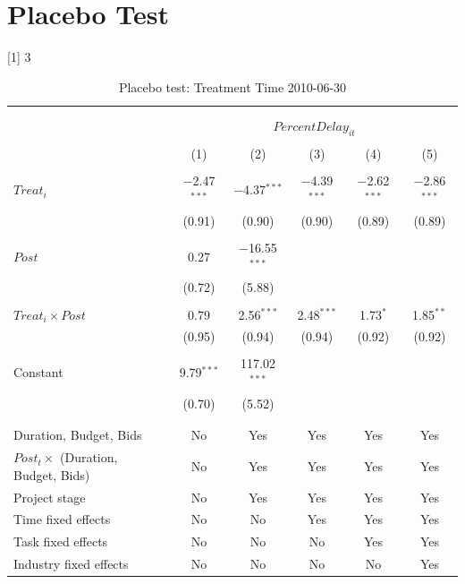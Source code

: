 \documentclass[
]{article}
\begin{document}
\hypertarget{placebo-test}{%
\section{Placebo Test}\label{placebo-test}}

{[}1{]} 3

\begin{table}[H] \centering 
  \caption{Placebo test: Treatment Time 2010-06-30} 
  \label{} 
\small 
\begin{tabular}{@{\extracolsep{-2pt}}lccccc} 
\\[-1.8ex]\hline 
\hline \\[-1.8ex] 
\\[-1.8ex] & \multicolumn{5}{c}{$PercentDelay_{it}$} \\ 
\\[-1.8ex] & (1) & (2) & (3) & (4) & (5)\\ 
\hline \\[-1.8ex] 
 $Treat_i$ & $-$2.47$^{***}$ & $-$4.37$^{***}$ & $-$4.39$^{***}$ & $-$2.62$^{***}$ & $-$2.86$^{***}$ \\ 
  & (0.91) & (0.90) & (0.90) & (0.89) & (0.89) \\ 
  & & & & & \\ 
 $Post$ & 0.27 & $-$16.55$^{***}$ &  &  &  \\ 
  & (0.72) & (5.88) &  &  &  \\ 
  & & & & & \\ 
 $Treat_i \times Post$ & 0.79 & 2.56$^{***}$ & 2.48$^{***}$ & 1.73$^{*}$ & 1.85$^{**}$ \\ 
  & (0.95) & (0.94) & (0.94) & (0.92) & (0.92) \\ 
  & & & & & \\ 
 Constant & 9.79$^{***}$ & 117.02$^{***}$ &  &  &  \\ 
  & (0.70) & (5.52) &  &  &  \\ 
  & & & & & \\ 
\hline \\[-1.8ex] 
Duration, Budget, Bids & No & Yes & Yes & Yes & Yes \\ 
$Post_t \times$  (Duration, Budget, Bids) & No & Yes & Yes & Yes & Yes \\ 
Project stage & No & Yes & Yes & Yes & Yes \\ 
Time fixed effects & No & No & Yes & Yes & Yes \\ 
Task fixed effects & No & No & No & Yes & Yes \\ 
Industry fixed effects & No & No & No & No & Yes \\ 

\end{tabular}
\end{table}
\end{document}
